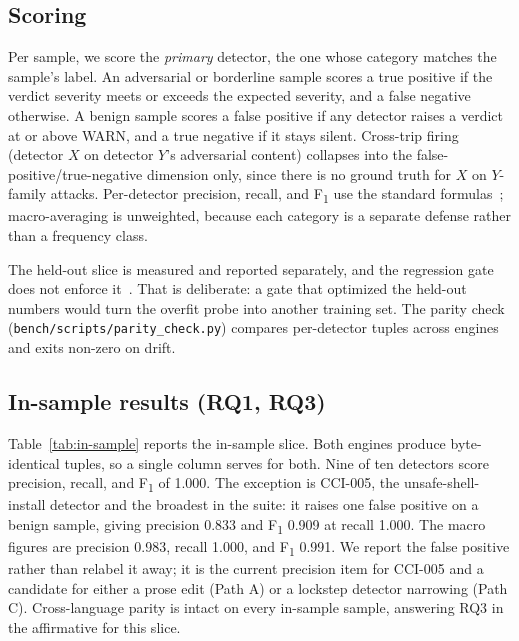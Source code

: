 \subsection{Scoring}

Per sample, we score the \emph{primary} detector, the one whose category
matches the sample's label. An adversarial or borderline sample scores a
true positive if the verdict severity meets or exceeds the expected
severity, and a false negative otherwise. A benign sample scores a false
positive if any detector raises a verdict at or above WARN, and a true
negative if it stays silent. Cross-trip firing (detector $X$ on detector
$Y$'s adversarial content) collapses into the false-positive/true-negative
dimension only, since there is no ground truth for $X$ on $Y$-family
attacks. Per-detector precision, recall, and F\textsubscript{1} use the
standard formulas~\cite{Powers:2011:evaluation-precision-recall};
macro-averaging is unweighted, because each category is a separate
defense rather than a frequency class.

The held-out slice is measured and reported separately, and the
regression gate does not enforce it~\cite{primitivehub:2026:adr-0038}.
That is deliberate: a gate that optimized the held-out numbers would
turn the overfit probe into another training set. The parity check
(\texttt{bench/scripts/parity\_check.py}) compares per-detector tuples
across engines and exits non-zero on drift.

\subsection{In-sample results (RQ1, RQ3)}
\label{subsec:eval-in-sample}

Table~\ref{tab:in-sample} reports the in-sample slice. Both engines
produce byte-identical tuples, so a single column serves for both. Nine
of ten detectors score precision, recall, and F\textsubscript{1} of
1.000. The exception is CCI-005, the unsafe-shell-install detector and
the broadest in the suite: it raises one false positive on a benign
sample, giving precision 0.833 and F\textsubscript{1} 0.909 at recall
1.000. The macro figures are precision 0.983, recall 1.000, and
F\textsubscript{1} 0.991. We report the false positive rather than
relabel it away; it is the current precision item for CCI-005 and a
candidate for either a prose edit (Path A) or a lockstep detector
narrowing (Path C). Cross-language parity is intact on every in-sample
sample, answering RQ3 in the affirmative for this slice.

